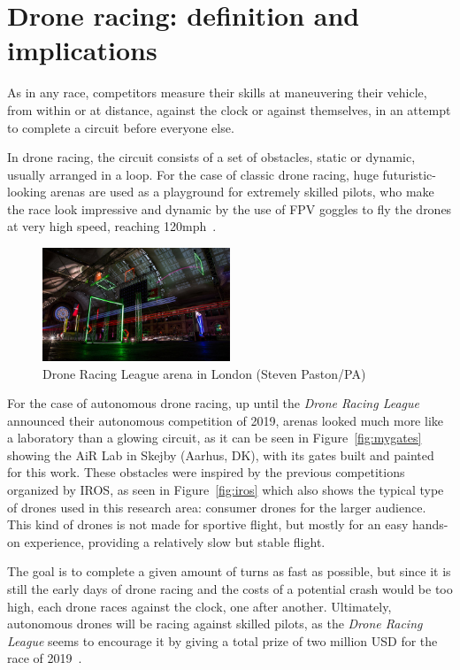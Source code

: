 \section{Drone racing: definition and implications}

As in any race, competitors measure their skills at maneuvering their vehicle,
from within or at distance, against the clock or against themselves, in an
attempt to complete a circuit before everyone else.

In drone racing, the circuit consists of a set of obstacles, static or
dynamic, usually arranged in a loop. For the case of classic drone racing, huge
futuristic-looking arenas are used as a playground for extremely skilled pilots,
who make the race look impressive and dynamic by the use of FPV goggles to fly
the drones at very high speed, reaching 120mph~\cite{DRL}.

\begin{figure}[h]
	\centering
	\includegraphics[width=0.5\textwidth]{figure/drl_arena.jpg}
	\caption{Drone Racing League arena in London (Steven
	Paston/PA)~\cite{DRLRecord}}
\end{figure}

For the case of autonomous drone racing, up until the \emph{Drone Racing
League} announced their autonomous competition of 2019, arenas looked much more
like a laboratory than a glowing circuit, as it can be seen in
Figure~\ref{fig:mygates} showing the AiR Lab in Skejby (Aarhus, DK), with its
gates built and painted for this work. These obstacles were inspired by the
previous competitions organized by IROS, as seen in Figure~\ref{fig:iros} which
also shows the typical type of drones used in this research area: consumer
drones for the larger audience. This kind of drones is not made for sportive
flight, but mostly for an easy hands-on experience, providing a relatively slow
but stable flight.

The goal is to complete a given amount of turns as fast as possible, but since
it is still the early days of drone racing and the costs of a potential crash
would be too high, each drone races against the clock, one after another.
Ultimately, autonomous drones will be racing against skilled pilots, as the
\emph{Drone Racing League} seems to encourage it by giving a total prize of two
million USD for the race of 2019~\cite{LockheedDRL}.


